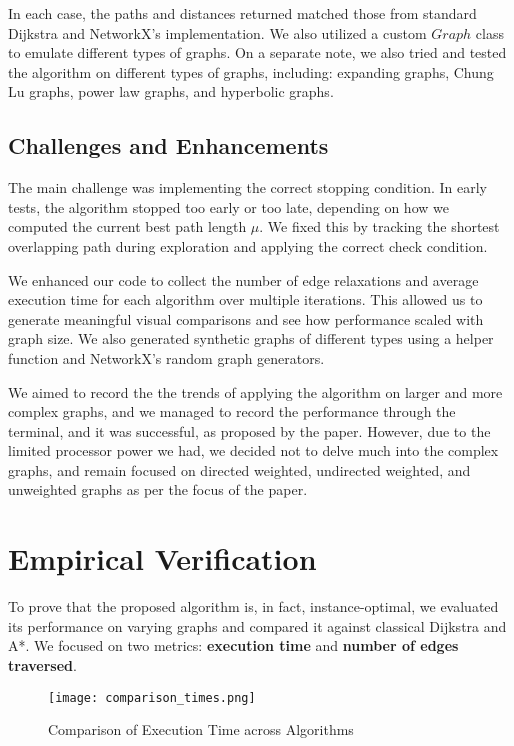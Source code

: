 \documentclass[12pt]{article}
\begin{document}
In each case, the paths and distances returned matched those from standard Dijkstra and NetworkX’s implementation. We also utilized a custom $Graph$ class to emulate different types of graphs. On a separate note, we also tried and tested the algorithm on different types of graphs, including: expanding graphs, Chung Lu graphs, power law graphs, and hyperbolic graphs.

\subsection{Challenges and Enhancements}
The main challenge was implementing the correct stopping condition. In early tests, the algorithm stopped too early or too late, depending on how we computed the current best path length $\mu$. We fixed this by tracking the shortest overlapping path during exploration and applying the correct check condition.

We enhanced our code to collect the number of edge relaxations and average execution time for each algorithm over multiple iterations. This allowed us to generate meaningful visual comparisons and see how performance scaled with graph size. We also generated synthetic graphs of different types using a helper function and NetworkX’s random graph generators.

We aimed to record the the trends of applying the algorithm on larger and more complex graphs, and we managed to record the performance through the terminal, and it was successful, as proposed by the paper. However, due to the limited processor power we had, we decided not to delve much into the complex graphs, and remain focused on directed weighted, undirected weighted, and unweighted graphs as per the focus of the paper.

\section{Empirical Verification}
To prove that the proposed algorithm is, in fact, instance-optimal, we evaluated its performance on varying graphs and compared it against classical Dijkstra and A*. We focused on two metrics: \textbf{execution time} and \textbf{number of edges traversed}. \\[1ex]

\begin{figure}[h]
    \centering
    \texttt{[image: comparison\_times.png]}
    \caption{Comparison of Execution Time across Algorithms}
    \label{fig:exec-time}
\end{figure}
\end{document}
